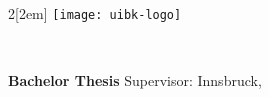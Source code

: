\frontmatter
\pagestyle{empty}

\begin{titlepage}
\rule{0mm}{1mm}

\begin{multicols}{2}[\columnsep2em] 
	\texttt{[image: uibk-logo]}
	\columnbreak
	\begin{flushright}
		\Large{\textsf{\MOrg}}
	\end{flushright}
\end{multicols}

\begin{flushright}
	{\large \MInstitution\\}
	{\large \MGroup}
\end{flushright}

\vspace*{1.5cm}

\begin{center}
	{\LARGE\bf \MTitle}
	\vskip 2.25cm
	\Large \textbf{Bachelor Thesis}
	\vskip 2.25cm
	{\Large \MAuthor}
	\vskip 1.5cm
	{\large Supervisor: \MSupervisor}   
	\vfill
	{\large Innsbruck, \MDate}
\end{center}
\end{titlepage} 

\ClearShipoutPicture